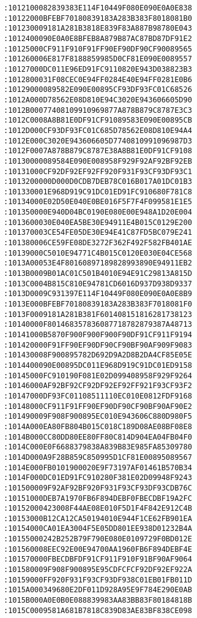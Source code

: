\begin{lstlisting}[language={}, basicstyle=\scriptsize, caption=Машинний код]
:1012100082839383E114F10449F080E090E0A0E838
:10122000BFEBF70180839183A283B383F8018081B0
:101230009181A281B3818E839F83A887B98780E043
:1012400090E0A0E8BFEB8A879B87AC87BD87DF91E2
:10125000CF911F910F91FF90EF90DF90CF90089565
:101260006E817F8188859985D0CF81E090E0089557
:10127000DC011E96ED91FC9110820E943D038823B3
:1012800031F08CEC0E94FF0284E40E94FF0281E0B6
:10129000089582E090E00895CF93DF93FC01C68526
:1012A000D78562E08D810E94C3020E943606605D90
:1012B00077408109910969877A878B879C8787E3C3
:1012C0008A8B81E0DF91CF91089583E090E00895CB
:1012D000CF93DF93FC01C685D78562E08D810E94A4
:1012E000C3020E943606605D7740810991096987D3
:1012F0007A878B879C8787E38A8B81E0DF91CF9108
:10130000089584E090E008958F929F92AF92BF92EB
:10131000CF92DF92EF92FF920F931F93CF93DF93C1
:1013200000D000D0CDB7DEB78C016B017A01DC01B3
:101330001E968D919C91DC01ED91FC910680F781C8
:10134000E02D50E040E0BE016F5F7F4F099581E1E5
:101350000E940D04BC0190E080E00E948A1D20E004
:1013600030E040EA5BE30E94911E4B015C0129E200
:101370003CE54FE05DE30E94E41C87FD5BC079E241
:101380006CE59FE08DE3272F362F492F582FB401AE
:10139000C5010E94771C4B015C0120E030E04CE568
:1013A00053E4F80160897189828993890E94911EB2
:1013B0009B01AC01C501B4010E94E91C29813A815D
:1013C0004B815C810E94781CD6016D937D938D9337
:1013D0009C931397E114F10449F080E090E0A0E8B9
:1013E000BFEBF70180839183A283B383F7018081F0
:1013F0009181A281B381F601408151816281738123
:10140000F801468357836087718782879387A48713
:10141000B5870F900F900F900F90DF91CF911F9194
:101420000F91FF90EF90DF90CF90BF90AF909F9083
:101430008F900895782D692D9A2D8B2DA4CF85E05E
:1014400090E00895DC011E968D919C91DC01ED9158
:10145000FC910190F081E02D099408958F929F9264
:10146000AF92BF92CF92DF92EF92FF921F93CF93F2
:10147000DF93FC01108511110EC010E0812FDF9168
:10148000CF911F91FF90EF90DF90CF90BF90AF90E2
:101490009F908F900895EC010E943606C880D980F5
:1014A000EA80FB804B015C018C189D08AE08BF08E8
:1014B000CC80DD80EE80FF80C814D904EA04FB04F0
:1014C000E0F6688379838A839B83E985FA85309780
:1014D000A9F28B859C850995D1CF81E00895089567
:1014E000FB0101900020E9F73197AF01461B570B34
:1014F000DC01ED91FC910280F381E02D09948F9243
:101500009F92AF92BF920F931F93CF93DF93CDB76C
:10151000DEB7A1970FB6F894DEBF0FBECDBF19A2FC
:10152000423008F44AE08E010F5D1F4F842E912C4B
:10153000B12CA12CA50194010E944F1CE62FB901EA
:10154000CA01EA3004F5E05DD801EE938D01232B4A
:10155000242B252B79F790E080E0109729F0BD012E
:101560008EEC92E00E94700AA1960FB6F894DEBF4E
:101570000FBECDBFDF91CF911F910F91BF90AF9064
:101580009F908F900895E95CDFCFCF92DF92EF922A
:10159000FF920F931F93CF93DF938C01EB01FB011D
:1015A000349680E2DF011D928A95E9F784E290E0AB
:1015B000A0E0B0E088839983AA83BB83F80184818B
:1015C0009581A681B7818C839D83AE83BF838CE098

\end{lstlisting}
